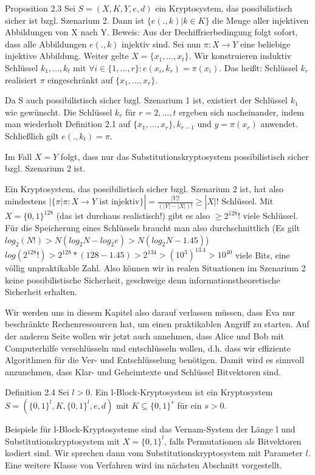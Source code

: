 \documentclass[a4paper]{article}
\begin{document}
\begin{multicols}{3}
    Proposition 2.3 Sei $S=(X,K,Y,e,d)$ ein Kryptosystem, das possibilistisch sicher ist bzgl. Szenarium 2. Dann ist $\{e(.,k)|k\in K\}$ die Menge aller injektiven Abbildungen von X nach Y.
    Beweis: Aus der Dechiffrierbedingung folgt sofort, dass alle Abbildungen $e(.,k)$ injektiv sind.
    Sei nun $\pi:X\rightarrow Y$ eine beliebige injektive Abbildung. Weiter gelte $X=\{x_1,...,x_t\}$. Wir konstruieren induktiv Schlüssel $k_1,...,k_t$ mit $\forall i\in\{1,...,r\}:e(x_i,k_r)=\pi(x_i)$.
    Das heißt: Schlüssel $k_r$ realisiert $\pi$ eingeschränkt auf $\{x_1,...,x_r\}$.

    Da S auch possibilistisch sicher bzgl. Szenarium 1 ist, existiert der Schlüssel $k_1$ wie gewünscht. Die Schlüssel $k_r$ für $r=2,...,t$ ergeben sich nacheinander, indem man wiederholt Definition 2.1 auf $\{x_1,...,x_r\},k_{r-1}$ und $y=\pi(x_r)$ anwendet. Schließlich gilt $e(.,k_t)=\pi$.

    Im Fall $X=Y$ folgt, dass nur das Substitutionskryptosystem possibilistisch sicher bzgl. Szenarium 2 ist.

    Ein Kryptosystem, das possibilistisch sicher bzgl. Szenarium 2 ist, hat also mindestens $|\{\pi |\pi :X\rightarrow Y\text{ ist injektiv}\}|=\frac{|Y|!}{(|Y|-|X|)!} \geq |X|!$ Schlüssel. Mit $X=\{0,1\}^{128}$  (das ist durchaus realistisch!) gibt es also $\geq 2^{128}!$ viele Schlüssel. Für die Speicherung eines Schlüssels braucht man also durchschnittlich (Es gilt $log_2(N!)>N(log_2 N-log_2 e)> N(log_2 N- 1.45)$) $log(2^{128}!)> 2^{128}*(128- 1.45)> 2^{134}>(10^3 )^{13.4} > 10^{40}$ viele Bits, eine völlig unpraktikable Zahl.
    Also können wir in realen Situationen im Szenarium 2 keine possibilistische Sicherheit, geschweige denn informationstheoretische Sicherheit erhalten.

    Wir werden uns in diesem Kapitel also darauf verlassen müssen, dass Eva nur beschränkte Rechenressourcen hat, um einen praktikablen Angriff zu starten. Auf der anderen Seite wollen wir jetzt auch annehmen, dass Alice und Bob mit Computerhilfe verschlüsseln und entschlüsseln wollen, d.h. dass wir effiziente Algorithmen für die Ver- und Entschlüsselung benötigen. Damit wird es sinnvoll anzunehmen, dass Klar- und Geheimtexte und Schlüssel Bitvektoren sind.

    Definition 2.4 Sei $l>0$. Ein l-Block-Kryptosystem ist ein Kryptosystem $S=(\{0,1\}^l,K,\{0,1\}^l,e,d)$ mit $K\subseteq \{0,1\}^s$ für ein $s>0$.

    Beispiele für l-Block-Kryptosysteme sind das Vernam-System der Länge l und Substitutionskryptosystem mit $X=\{0,1\}^l$, falls Permutationen als Bitvektoren kodiert sind. Wir sprechen dann vom Substitutionskryptosystem mit Parameter $l$.
    Eine weitere Klasse von Verfahren wird im nächsten Abschnitt vorgestellt.


\end{multicols}
\end{document}

